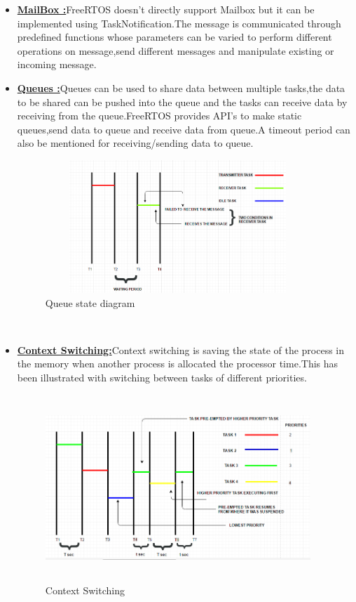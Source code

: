 \documentclass[a4paper,12pt,oneside]{book}
\begin{document}
\begin{itemize}
\\
\item \textbf{\href{https://github.com/eYSIP-2016/RTOS_LPC2148/tree/master/MailBox}{MailBox :}}FreeRTOS doesn't directly support Mailbox but it can be implemented using TaskNotification.The message is communicated through predefined functions whose parameters can be varied to perform different operations on message,send different messages and manipulate existing or incoming message.
\\
\item \textbf{\href{https://github.com/eYSIP-2016/RTOS_LPC2148/tree/master/Queue}{Queues :}}Queues can be used to share data between multiple tasks,the data to be shared can be pushed into the queue and the tasks can receive data by receiving from the queue.FreeRTOS provides API's to make static queues,send data to queue and receive data from queue.A timeout period can also be mentioned for receiving/sending data to queue.
\begin{figure}[h]
\centering
\includegraphics[width=10cm,height=5cm]{QUEUE.PNG}
\caption{Queue state diagram}
\end{figure}

\\
\item \textbf{\href{https://github.com/eYSIP-2016/RTOS_LPC2148/tree/master/ContextSwitching}{Context Switching:}}Context switching is saving the state of the process in the memory when another process is allocated the processor time.This has been illustrated with switching between tasks of different priorities.
\begin{figure}[h]
\centering
\includegraphics[width=10cm,height=7cm]{CONTEXTSWITCHING.PNG}
\caption{Context Switching}
\end{figure}
\newpage



\end{itemize}
\end{document}
